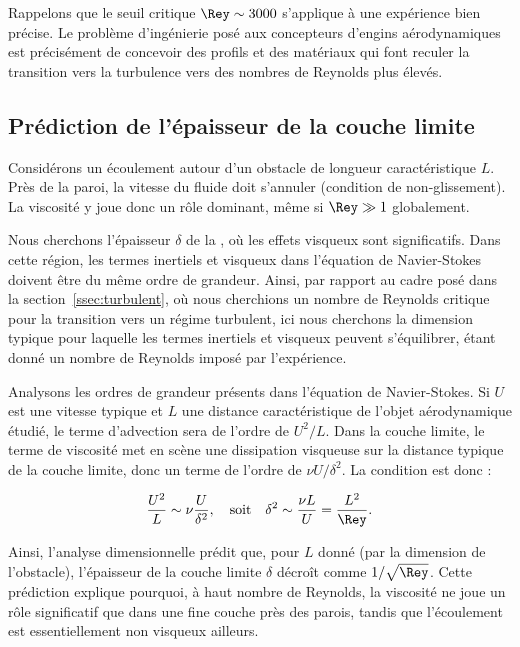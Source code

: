 Rappelons que le seuil critique $\Rey \sim 3000$ s'applique à une expérience bien précise. Le problème d'ingénierie posé aux concepteurs d'engins aérodynamiques est précisément de concevoir des profils et des matériaux qui font reculer la transition vers la turbulence vers des nombres de Reynolds plus élevés.

\subsection{Prédiction de l'épaisseur de la couche limite}
Considérons un écoulement autour d’un obstacle de longueur caractéristique $L$. Près de la paroi, la vitesse du fluide doit s’annuler (condition de non-glissement). La viscosité y joue donc un rôle dominant, même si $\Rey \gg 1$ globalement.

Nous cherchons l’épaisseur $\delta$ de la , où les effets visqueux sont significatifs. Dans cette région, les termes inertiels et visqueux dans l’équation de Navier-Stokes doivent être du même ordre de grandeur. Ainsi, par rapport au cadre posé dans la section~\ref{ssec:turbulent}, où nous cherchions un nombre de Reynolds critique pour la transition vers un régime turbulent, ici nous cherchons la dimension typique pour laquelle les termes inertiels et visqueux peuvent s'équilibrer, étant donné un nombre de Reynolds imposé par l'expérience.

Analysons les ordres de grandeur présents dans l'équation de Navier-Stokes. Si $U$ est une vitesse typique et $L$ une distance caractéristique de l'objet aérodynamique étudié, le terme d'advection sera de l'ordre de $U^2/L$. Dans la couche limite, le terme de viscosité met en scène une dissipation visqueuse sur la distance typique de la couche limite, donc un terme de l'ordre de $\nu U/\delta^2$. La condition est donc :

\begin{displaymath}
  \frac{U^2}{L} \sim \nu \frac{U}{\delta^2}, \quad \text{soit} \quad \delta^2 \sim \frac{\nu L}{U} = \frac{L^2}{\Rey}.
\end{displaymath}

Ainsi, l’analyse dimensionnelle prédit que, pour $L$ donné (par la dimension de l'obstacle), l’épaisseur de la couche limite $\delta$ décroît comme $1/\sqrt{\Rey}$. Cette prédiction explique pourquoi, à haut nombre de Reynolds, la viscosité ne joue un rôle significatif que dans une fine couche près des parois, tandis que l’écoulement est essentiellement non visqueux ailleurs.


